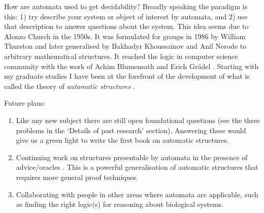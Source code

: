 \documentclass[12pt]{article}
\theoremstyle{plain} \numberwithin{equation}{section}
\theoremstyle{definition}
\begin{document}
How are automata used to get decidability?
Broadly speaking the paradigm is this: 1) try describe your system or object of interest by automata, and 2) use that description to answer questions about the system. This idea seems due to Alonzo Church in the 1950s. It was formulated for groups in 1986 by William Thurston \cite{CEHLPT92} and later generalised by Bakhadyr Khoussainov and Anil Nerode \cite{KhNe95} to arbitrary mathematical structures.
It reached the logic in computer science community with the work of Achim Blumensath and Erich Gr\"adel \cite{BLGr02}. Starting with my graduate studies  I have been at the forefront of the development of what is called the theory of {\em automatic structures} \cite{Rubi04} \cite{Rubi08}.





Future plans:
\begin{enumerate}
\item 
Like any new subject there are still open foundational questions (see the three problems in the `Details of past research' section). Answering these would give us a green light to write the first book on automatic structures.

\item Continuing work on structures presentable by automata in the presence of advice/oracles \cite{CoLo06} \cite{KRSZ} \cite{BKRa}. This is a powerful generalisation of automatic structures that requires more general proof techniques.
\item Collaborating with people in other areas where automata are applicable, such as finding the right logic(s) for reasoning about biological systems.
\end{enumerate}
\end{document}
